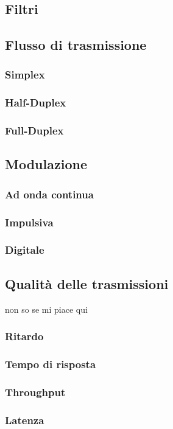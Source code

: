 \documentclass[a4paper,11pt]{paper}
\begin{document}
\subsection{Filtri}

\subsection{Flusso di trasmissione}
\subsubsection{Simplex}
\subsubsection{Half-Duplex}
\subsubsection{Full-Duplex}

\subsection{Modulazione}
\subsubsection{Ad onda continua}
\subsubsection{Impulsiva}
\subsubsection{Digitale}

\subsection{Qualità delle trasmissioni} non so se mi piace qui
\subsubsection{Ritardo}
\subsubsection{Tempo di risposta}
\subsubsection{Throughput}
\subsubsection{Latenza}
\end{document}
